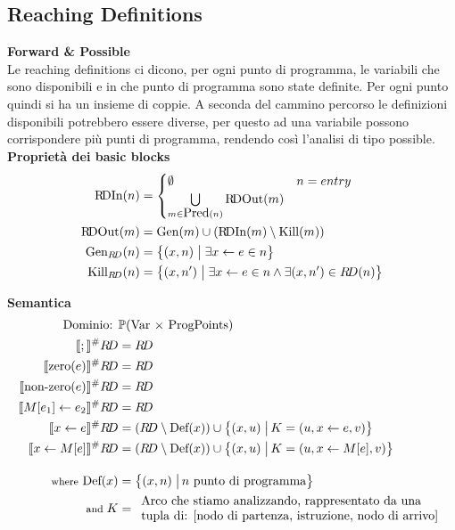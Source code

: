 \documentclass[a4paper,12pt,openany]{article}
\newcommand{\RD}{R\!D}
\begin{document}
\clearpage
\subsection{Reaching Definitions}
\textbf{Forward \& Possible}\\[1em]
Le reaching definitions ci dicono, per ogni punto di programma, le variabili che sono disponibili e in che punto di programma sono state definite. Per ogni punto quindi si ha un insieme di coppie. A seconda del cammino percorso le definizioni disponibili potrebbero essere diverse, per questo ad una variabile possono corrispondere più punti di programma, rendendo così l'analisi di tipo possible.
\\[1em]

\noindent\textbf{Proprietà dei basic blocks}
\begin{align*}
    \mbox{\RD In}(n) &=
    \begin{cases}
        \emptyset & n = entry\\
        \bigcup\limits_{m\in \mbox{Pred}(n)} \mbox{\RD Out}(m)
    \end{cases}\\
    \mbox{\RD Out}(m) &= \mbox{Gen}(m) \cup (\mbox{\RD In}(m) \setminus \mbox{Kill}(m))\\
    \mbox{Gen}_{\RD}(n) &= \left\{
        (x,n) \;\big\vert\; \exists x\leftarrow e \in n
    \right\}\\
    \mbox{Kill}_{\RD}(n) &= \left\{
        (x,n') \;\big\vert\; \exists x\leftarrow e \in n \land \exists (x,n')\in\RD(n)
    \right\}
\end{align*}

\textbf{Semantica}
\begin{align*}
    \mbox{Dominio: }& \mathbb{P}(\mbox{Var $\times$ ProgPoints})\\
    \llbracket ; \rrbracket^\#\RD &= \RD\\
    \llbracket \mbox{zero}(e) \rrbracket^\#\RD &= \RD\\
    \llbracket \mbox{non-zero}(e) \rrbracket^\#\RD &= \RD\\
    \llbracket M[e_1]\leftarrow e_2 \rrbracket^\#\RD &= \RD\\
    \llbracket x \leftarrow e \rrbracket^\#\RD &= (\RD\setminus \mbox{Def}(x)) \cup
    \left\{
        (x, u) \;\big\vert\, K = (u, x\leftarrow e, v)
    \right\}\\
    \llbracket x\leftarrow M[e] \rrbracket^\#\RD &= (\RD\setminus \mbox{Def}(x)) \cup
    \left\{
        (x, u) \;\big\vert\, K = (u, x\leftarrow M[e], v)
    \right\}\\[1em]
    \mbox{{\footnotesize where} Def}(x) &=
    \left\{
        (x, n) \;\big\vert\, n \mbox{ punto di programma}
    \right\}\\
    \mbox{\footnotesize and } K &= 
    \begin{array}{ll}
        \mbox{Arco che stiamo analizzando, rappresentato da una}\\
        \mbox{tupla di: [nodo di partenza, istruzione, nodo di arrivo]}
    \end{array}
\end{align*}
\end{document}
